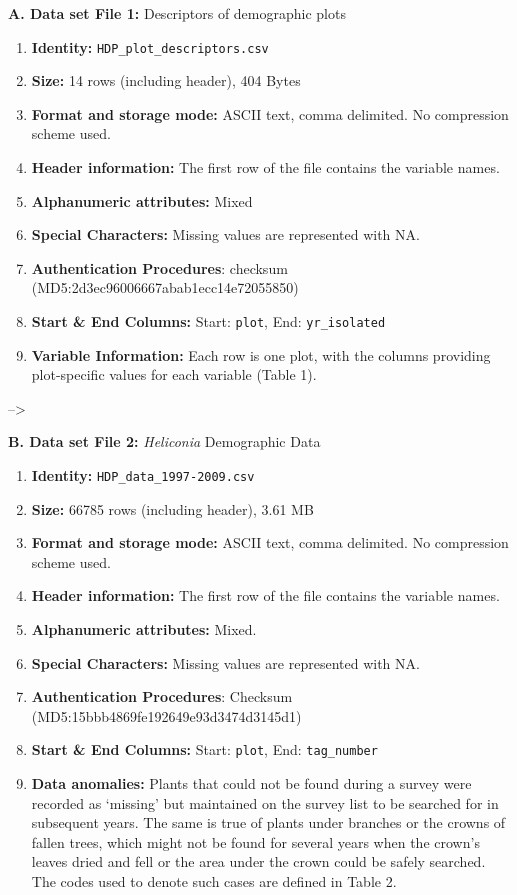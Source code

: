 \documentclass[
  12pt,
  man, donotrepeattitle,floatsintext]{apa6}
\begin{document}
\noindent  
\textbf{A. Data set File 1:} Descriptors of demographic plots

\begin{enumerate}
\def\labelenumi{\arabic{enumi}.}
\item
  \textbf{Identity:} \texttt{HDP\_plot\_descriptors.csv}
\item
  \textbf{Size:} 14 rows (including header), 404 Bytes
\item
  \textbf{Format and storage mode:} ASCII text, comma delimited. No
  compression scheme used.
\item
  \textbf{Header information:} The first row of the file contains the variable names.
\item
  \textbf{Alphanumeric attributes:} Mixed
\item
  \textbf{Special Characters:} Missing values are represented with NA.
\item
  \textbf{Authentication Procedures}: checksum (MD5:2d3ec96006667abab1ecc14e72055850)
\item
  \textbf{Start \& End Columns:} Start: \texttt{plot}, End: \texttt{yr\_isolated}
\item
  \textbf{Variable Information:} Each row is one plot, with the columns providing plot-specific values for each variable (Table 1).
\end{enumerate}

--\textgreater{}

\noindent 
\textbf{B. Data set File 2:} \emph{Heliconia} Demographic Data

\begin{enumerate}
\def\labelenumi{\arabic{enumi}.}
\item
  \textbf{Identity:} \texttt{HDP\_data\_1997-2009.csv}
\item
  \textbf{Size:} 66785 rows (including header), 3.61 MB
\item
  \textbf{Format and storage mode:} ASCII text, comma delimited. No compression scheme used.
\item
  \textbf{Header information:} The first row of the file contains the variable names.
\item
  \textbf{Alphanumeric attributes:} Mixed.
\item
  \textbf{Special Characters:} Missing values are represented with NA.
\item
  \textbf{Authentication Procedures}: Checksum (MD5:15bbb4869fe192649e93d3474d3145d1)
\item
  \textbf{Start \& End Columns:} Start: \texttt{plot}, End: \texttt{tag\_number}
\item
  \textbf{Data anomalies:} Plants that could not be found during a survey were recorded as `missing' but maintained on the survey list to be searched for in subsequent years. The same is true of plants under branches or the crowns of fallen trees, which might not be found for several years when the crown's leaves dried and fell or the area under the crown could be safely searched. The codes used to denote such cases are defined in Table 2.
\end{enumerate}
\end{document}
